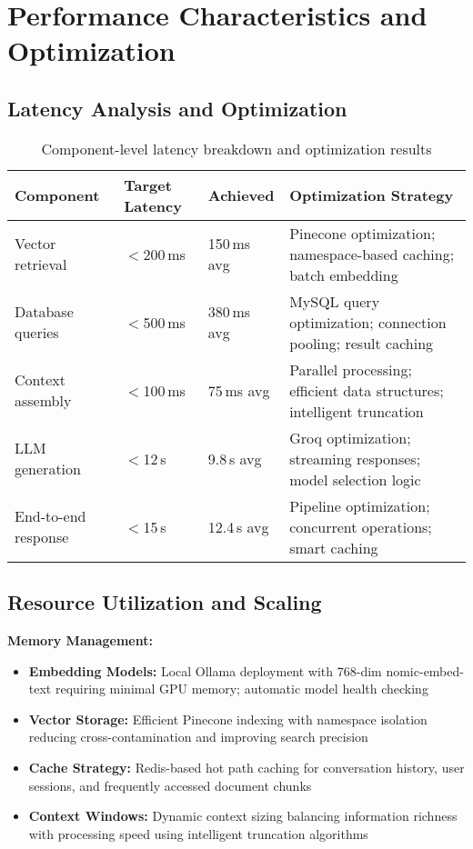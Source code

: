 \section{Performance Characteristics and Optimization}
\label{sec:performance_s2}

\subsection{Latency Analysis and Optimization}
\label{subsec:latency_analysis_s2}

\begin{table}[H]
\centering
\caption{Component-level latency breakdown and optimization results}
\label{tab:latency_analysis_s2}
\begin{tabular}{|p{4cm}|p{2.5cm}|p{3cm}|p{5.5cm}|}
\hline
\textbf{Component} & \textbf{Target Latency} & \textbf{Achieved} & \textbf{Optimization Strategy} \\
\hline
Vector retrieval & $<$200\,ms & 150\,ms avg & Pinecone optimization; namespace-based caching; batch embedding \\
\hline
Database queries & $<$500\,ms & 380\,ms avg & MySQL query optimization; connection pooling; result caching \\
\hline
Context assembly & $<$100\,ms & 75\,ms avg & Parallel processing; efficient data structures; intelligent truncation \\
\hline
LLM generation & $<$12\,s & 9.8\,s avg & Groq optimization; streaming responses; model selection logic \\
\hline
End-to-end response & $<$15\,s & 12.4\,s avg & Pipeline optimization; concurrent operations; smart caching \\
\hline
\end{tabular}
\end{table}

\subsection{Resource Utilization and Scaling}
\label{subsec:resource_utilization_s2}

\textbf{Memory Management:}
\begin{itemize}
    \item \textbf{Embedding Models:} Local Ollama deployment with 768-dim nomic-embed-text requiring minimal GPU memory; automatic model health checking
    \item \textbf{Vector Storage:} Efficient Pinecone indexing with namespace isolation reducing cross-contamination and improving search precision
    \item \textbf{Cache Strategy:} Redis-based hot path caching for conversation history, user sessions, and frequently accessed document chunks
    \item \textbf{Context Windows:} Dynamic context sizing balancing information richness with processing speed using intelligent truncation algorithms
\end{itemize}

